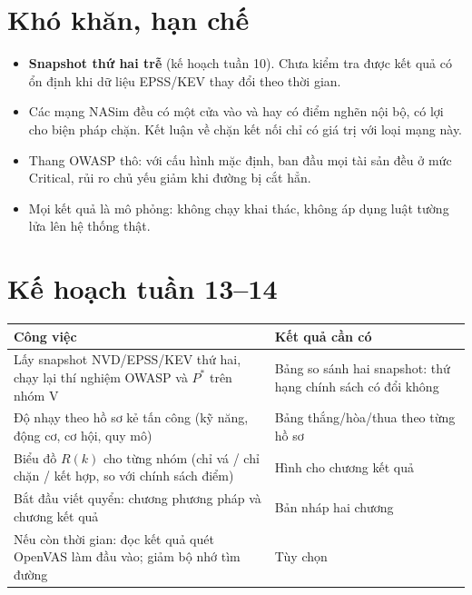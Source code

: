 \documentclass[11pt,a4paper]{article}
\begin{document}
\section{Khó khăn, hạn chế}

\begin{itemize}
  \item \textbf{Snapshot thứ hai trễ} (kế hoạch tuần 10). Chưa kiểm tra được kết quả có ổn định khi dữ liệu EPSS/KEV thay đổi theo thời gian.
  \item Các mạng NASim đều có một cửa vào và hay có điểm nghẽn nội bộ, có lợi cho biện pháp chặn. Kết luận về chặn kết nối chỉ có giá trị với loại mạng này.
  \item Thang OWASP thô: với cấu hình mặc định, ban đầu mọi tài sản đều ở mức Critical, rủi ro chủ yếu giảm khi đường bị cắt hẳn.
  \item Mọi kết quả là mô phỏng: không chạy khai thác, không áp dụng luật tường lửa lên hệ thống thật.
\end{itemize}

\section{Kế hoạch tuần 13--14}

\begin{center}\small
\begin{tabular}{@{}Y{7.4cm}Y{7.4cm}@{}}
\toprule
\textbf{Công việc} & \textbf{Kết quả cần có} \\
\midrule
Lấy snapshot NVD/EPSS/KEV thứ hai, chạy lại thí nghiệm OWASP và $P^{*}$ trên nhóm V & Bảng so sánh hai snapshot: thứ hạng chính sách có đổi không \\
Độ nhạy theo hồ sơ kẻ tấn công (kỹ năng, động cơ, cơ hội, quy mô) & Bảng thắng/hòa/thua theo từng hồ sơ \\
Biểu đồ $R(k)$ cho từng nhóm (chỉ vá / chỉ chặn / kết hợp, so với chính sách điểm) & Hình cho chương kết quả \\
Bắt đầu viết quyển: chương phương pháp và chương kết quả & Bản nháp hai chương \\
Nếu còn thời gian: đọc kết quả quét OpenVAS làm đầu vào; giảm bộ nhớ tìm đường & Tùy chọn \\
\bottomrule
\end{tabular}
\end{center}
\end{document}
